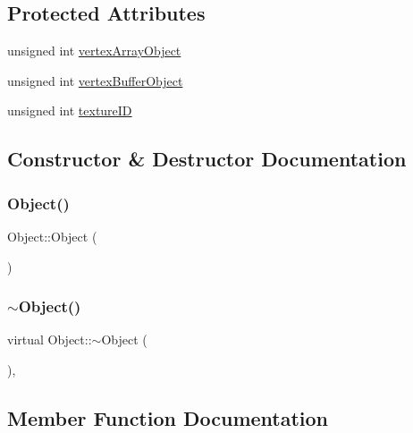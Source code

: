 \subsection*{Protected Attributes}
\begin{DoxyCompactItemize}
\item 
unsigned int \hyperlink{classObject_abb132c1ff3bc3c4115f7c48c43f67474}{vertex\+Array\+Object}
\item 
unsigned int \hyperlink{classObject_a2eeb21fc71ed8449cf61d36d99cb0257}{vertex\+Buffer\+Object}
\item 
unsigned int \hyperlink{classObject_a7ed4c3e30bec9ca76a7e820c5d3fdb6d}{texture\+ID}
\end{DoxyCompactItemize}


\subsection{Constructor \& Destructor Documentation}
\mbox{\label{classObject_afe9eeddd7068a37f62d3276a2fb49864}} 
\subsubsection{\texorpdfstring{Object()}{Object()}}
{\footnotesize\ttfamily Object\+::\+Object (\begin{DoxyParamCaption}{ }\end{DoxyParamCaption})\hspace{0.3cm}{\ttfamily [default]}}

\mbox{\label{classObject_a226f2ae2af766b77d83c09a4d766b725}} 
\subsubsection{\texorpdfstring{$\sim$\+Object()}{~Object()}}
{\footnotesize\ttfamily virtual Object\+::$\sim$\+Object (\begin{DoxyParamCaption}{ }\end{DoxyParamCaption})\hspace{0.3cm}{\ttfamily [virtual]}, {\ttfamily [default]}}



\subsection{Member Function Documentation}
\mbox{\label{classObject_a69e91bef2c9f048aa4509329dc44948e}} 
